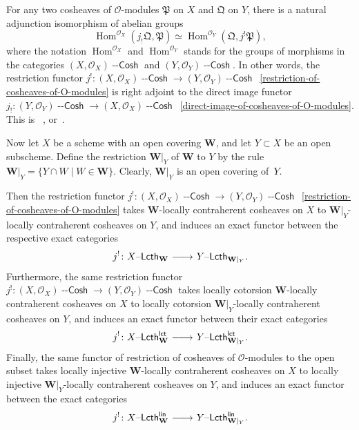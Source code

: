 \documentclass[12pt,a4paper]{amsart}
\newcommand{\+}{\nobreakdash-}
\renewcommand{\:}{\colon}
\newcommand{\rarrow}{\longrightarrow}
\newcommand{\lrarrow}{\mskip.5\thinmuskip\relbar\joinrel\relbar
   \joinrel\rightarrow\mskip.5\thinmuskip\relax}
\DeclareMathOperator{\Hom}{Hom}
\newcommand{\Lcth}{{\operatorname{\mathsf{--Lcth}}}}
\newcommand{\Cosh}{{\operatorname{\mathsf{--Cosh}}}}
\newcommand{\lct}{\mathsf{lct}}
\newcommand{\lin}{\mathsf{lin}}
\newcommand{\bW}{\mathbf W}
\newcommand{\cO}{\mathcal O}
\newcommand{\fP}{\mathfrak P}
\newcommand{\fQ}{\mathfrak Q}
\theoremstyle{plain}
\theoremstyle{definition}
\begin{document}
 For any two cosheaves of $\cO$\+modules $\fP$ on $X$ and $\fQ$ on $Y$,
there is a natural adjunction isomorphism of abelian groups
\begin{equation} \label{cosheaves-direct-image-restriction-adjunction}
 \Hom^{\cO_X}(j_!\fQ,\fP)\simeq\Hom^{\cO_Y}(\fQ,j^!\fP),
\end{equation}
where the notation $\Hom^{\cO_X}$ and $\Hom^{\cO_Y}$ stands for
the groups of morphisms in the categories $(X,\cO_X)\Cosh$ and
$(Y,\cO_Y)\Cosh$.
 In other words, the restriction functor $j^!\:(X,\cO_X)\Cosh\rarrow
(Y,\cO_Y)\Cosh$ \,\eqref{restriction-of-cosheaves-of-O-modules} is
right adjoint to the direct image functor $j_!\:(Y,\cO_Y)\Cosh\rarrow
(X,\cO_X)\Cosh$ \,\eqref{direct-image-of-cosheaves-of-O-modules}.
 This is~\cite[formula~(2.7) in Section~2.3]{Pcosh}
\cite[formula~(19) in Section~2.4]{Pdomc}, or~\cite[formula~(30)
in Section~3.10]{Pform}.

 Now let $X$ be a scheme with an open covering $\bW$, and let
$Y\subset X$ be an open subscheme.
 Define the restriction $\bW|_Y$ of $\bW$ to $Y$ by the rule
$\bW|_Y=\{Y\cap W\mid W\in\bW\}$.
 Clearly, $\bW|_Y$ is an open covering of~$Y$.

 Then the restriction functor $j^!\:(X,\cO_X)\Cosh\rarrow
(Y,\cO_Y)\Cosh$ \,\eqref{restriction-of-cosheaves-of-O-modules}
takes $\bW$\+locally contraherent cosheaves on $X$ to
$\bW|_Y$\+locally contraherent cosheaves on $Y$, and induces
an exact functor between the respective exact categories
\begin{equation} \label{restriction-of-lcth-cosheaves}
 j^!\:X\Lcth_\bW\lrarrow Y\Lcth_{\bW|_Y}.
\end{equation}
 Furthermore, the same restriction functor $j^!\:(X,\cO_X)\Cosh
\rarrow(Y,\cO_Y)\Cosh$ takes locally cotorsion $\bW$\+locally
contraherent cosheaves on $X$ to locally cotorsion $\bW|_Y$\+locally
contraherent cosheaves on $Y$, and induces an exact functor between
their exact categories
\begin{equation} \label{restriction-of-lcth-lct-cosheaves}
 j^!\:X\Lcth^\lct_\bW\lrarrow Y\Lcth^\lct_{\bW|_Y}.
\end{equation}
 Finally, the same functor of restriction of cosheaves of
$\cO$\+modules to the open subset takes locally injective
$\bW$\+locally contraherent cosheaves on $X$ to locally injective
$\bW|_Y$\+locally contraherent cosheaves on $Y$, and induces
an exact functor between the exact categories
\begin{equation} \label{restriction-of-lcth-lin-cosheaves}
 j^!\:X\Lcth^\lin_\bW\lrarrow Y\Lcth^\lin_{\bW|_Y}.
\end{equation}
\end{document}
